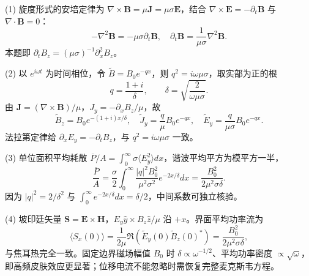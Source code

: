 (1) 旋度形式的安培定律为 \(\nabla\times\boldsymbol B=\mu\boldsymbol J=\mu\sigma\boldsymbol E\)，结合 \(\nabla\times\boldsymbol E=-\partial_t\boldsymbol B\) 与 \(\nabla\cdot\boldsymbol B=0\)：
\[
-\nabla^2\boldsymbol B=-\mu\sigma\partial_t\boldsymbol B,\quad
\partial_t\boldsymbol B=\frac1{\mu\sigma}\nabla^2\boldsymbol B.
\]
本题即 \(\partial_t B_z=(\mu\sigma)^{-1}\partial_x^2B_z\)。

(2) 以 \(e^{i\omega t}\) 为时间相位，令 \(\tilde B=B_0e^{-qx}\)，则 \(q^2=i\omega\mu\sigma\)，取实部为正的根
\[
q=\frac{1+i}{\delta},\qquad \delta=\sqrt{\frac2{\omega\mu\sigma}}.
\]
由 \(\boldsymbol J=(\nabla\times\boldsymbol B)/\mu\)，\(J_y=-\partial_xB_z/\mu\)，故
\[
\tilde B_z=B_0e^{-(1+i)x/\delta},\quad
\tilde J_y=\frac q\mu B_0e^{-qx},\quad
\tilde E_y=\frac q{\mu\sigma}B_0e^{-qx}.
\]
法拉第定律给 \(\partial_xE_y=-\partial_tB_z\)，与 \(q^2=i\omega\mu\sigma\) 一致。

(3) 单位面积平均耗散 \(\overline P/A=\int_0^\infty\sigma\langle E_y^2\rangle dx\)，谐波平均平方为模平方一半，
\[
\frac{\overline P}{A}=\frac{\sigma}{2}\int_0^\infty
\frac{|q|^2B_0^2}{\mu^2\sigma^2}e^{-2x/\delta}dx
=\frac{B_0^2}{2\mu^2\sigma\delta}.
\]
因为 \(|q|^2=2/\delta^2\) 与 \(\int_0^\infty e^{-2x/\delta}dx=\delta/2\)，中间系数可独立核验。

(4) 坡印廷矢量 \(\boldsymbol S=\boldsymbol E\times\boldsymbol H\)，\(E_y\hat y\times B_z\hat z/\mu\) 沿 \(+x\)。界面平均功率流为
\[
\langle S_x(0)\rangle=\frac1{2\mu}\Re(\tilde E_y(0)\tilde B_z(0)^*)
=\frac{B_0^2}{2\mu^2\sigma\delta},
\]
与焦耳热完全一致。固定边界磁场幅值 \(B_0\) 时 \(\delta\propto\omega^{-1/2}\)、平均功率密度 \(\propto\sqrt\omega\)，即高频皮肤效应更显著；位移电流不能忽略时需恢复完整麦克斯韦方程。
